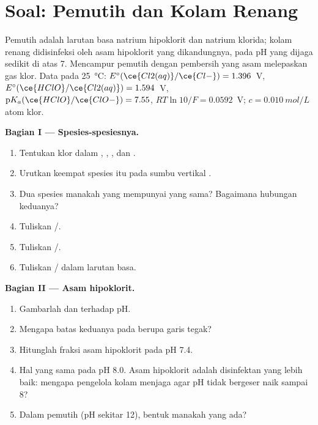 \section{Soal: Pemutih dan Kolam Renang}

\begin{problem}
\label{pb:b1:e-ph-diagrams:1}
Pemutih adalah larutan basa natrium hipoklorit dan natrium klorida;
kolam renang didisinfeksi oleh asam hipoklorit yang dikandungnya, pada
pH yang dijaga sedikit di atas 7. Mencampur pemutih dengan pembersih
yang asam melepaskan gas klor. Data pada \qty{25}{\celsius}:
$E^\circ(\ce{Cl2(aq)}/\ce{Cl-})
= 1.396$~V,
$E^\circ(\ce{HClO}/\ce{Cl2(aq)}) = 1.594$~V,
$\mathrm{p}K_a(\ce{HClO}/\ce{ClO-}) = 7.55$, $RT\ln 10/F = 0.0592$~V;
 $c = \qty{0.010}{mol/L}$ atom klor.

\medskip
\noindent\textbf{Bagian I --- Spesies-spesiesnya.}
\begin{enumerate}
  \item Tentukan  klor dalam , ,
        , dan .
  \item Urutkan keempat spesies itu pada sumbu vertikal .
  \item Dua spesies manakah yang mempunyai  yang sama?
        Bagaimana hubungan keduanya?
  \item Tuliskan  /.
  \item Tuliskan  /.
  \item Tuliskan  / dalam larutan basa.
\end{enumerate}

\medskip
\noindent\textbf{Bagian II --- Asam hipoklorit.}
\begin{enumerate}[resume]
  \item Gambarlah   dan  terhadap
        pH.
  \item Mengapa batas keduanya pada  berupa garis
        tegak?
  \item Hitunglah fraksi asam hipoklorit pada pH 7.4.
  \item Hal yang sama pada pH 8.0. Asam hipoklorit adalah disinfektan
        yang lebih baik: mengapa pengelola kolam menjaga agar pH tidak
        bergeser naik sampai 8?
  \item Dalam pemutih (pH sekitar 12), bentuk manakah yang ada?
\end{enumerate}


\end{problem}
